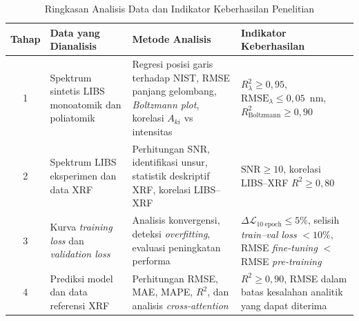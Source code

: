 \begin{table}[htbp]
\centering
\caption{Ringkasan Analisis Data dan Indikator Keberhasilan Penelitian}
\label{tab:analisis_data}
\small
\begin{tabularx}{\textwidth}{|c|X|X|X|}
\hline
\textbf{Tahap} & \textbf{Data yang Dianalisis} & \textbf{Metode Analisis} & \textbf{Indikator Keberhasilan} \\
\hline
1 &
Spektrum sintetis LIBS monoatomik dan poliatomik &
Regresi posisi garis terhadap NIST, RMSE panjang gelombang, \textit{Boltzmann plot}, korelasi $A_{ki}$ vs intensitas &
$R^2_{\lambda} \geq 0{,}95$, $\mathrm{RMSE}_{\lambda} \leq 0{,}05$~nm, $R^2_{\mathrm{Boltzmann}} \geq 0{,}90$ \\
\hline
2 &
Spektrum LIBS eksperimen dan data XRF &
Perhitungan SNR, identifikasi unsur, statistik deskriptif XRF, korelasi LIBS--XRF &
$\mathrm{SNR} \geq 10$, korelasi LIBS--XRF $R^2 \geq 0{,}80$ \\
\hline
3 &
Kurva \textit{training loss} dan \textit{validation loss} &
Analisis konvergensi, deteksi \textit{overfitting}, evaluasi peningkatan performa &
$\Delta \mathcal{L}_{10\ \text{epoch}} \leq 5\%$, selisih \textit{train--val loss} ${<}10\%$, RMSE \textit{fine-tuning} $<$ RMSE \textit{pre-training} \\
\hline
4 &
Prediksi model dan data referensi XRF &
Perhitungan RMSE, MAE, MAPE, $R^2$, dan analisis \textit{cross-attention} &
$R^2 \geq 0{,}90$, RMSE dalam batas kesalahan analitik yang dapat diterima \\
\hline
\end{tabularx}
\end{table}